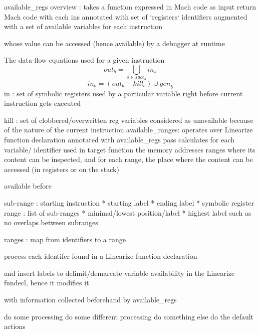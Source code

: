 available\_regs overview :
takes a function expressed in Mach code as input
return Mach code with each ins annotated with set of `registers` identifiers
augmented with a set of available variables for each instruction

whose value can be accessed (hence available) by a debugger at runtime

The data-flow equations used for a given instruction
\[
    \textit{out}_{b} = \bigcup_{s \in succ_{b}} \textit{in}_{s}
\]
\[
    \textit{in}_{b} = (\textit{out}_{b} - \textit{kill}_{b}) \cup \textit{gen}_{b}
\]
in : set of symbolic registers used by a particular variable right before
current instruction gets executed

kill : set of clobbered/overwritten reg variables considered as unavailable because of the nature of the
current instruction
available\_ranges:
operates over Linearize function declaration annotated with available\_regs pass
calculates for each variable/ identifier used in target function the memory
addresses ranges where its content can be inspected, and for each range, the
place where the content can be accessed (in registers or on the stack)

available before

sub-range : starting instruction * starting label * ending label * symbolic
register
range : list of sub-ranges * minimal/lowest position/label * highest label
such as no overlaps between subranges



ranges : map from identifiers to a range

process each identifer found in a Linearize function declaration

and insert labels to delimit/demarcate variable availability in the Linearize
fundecl, hence it modifies it

with information collected beforehand by available\_regs

\begin{algorithmic}[1]
    \State do some processing
    \State do some different processing
    \State do something else
    \Else
    \State do the default actions
    \EndIf
\end{algorithmic}


